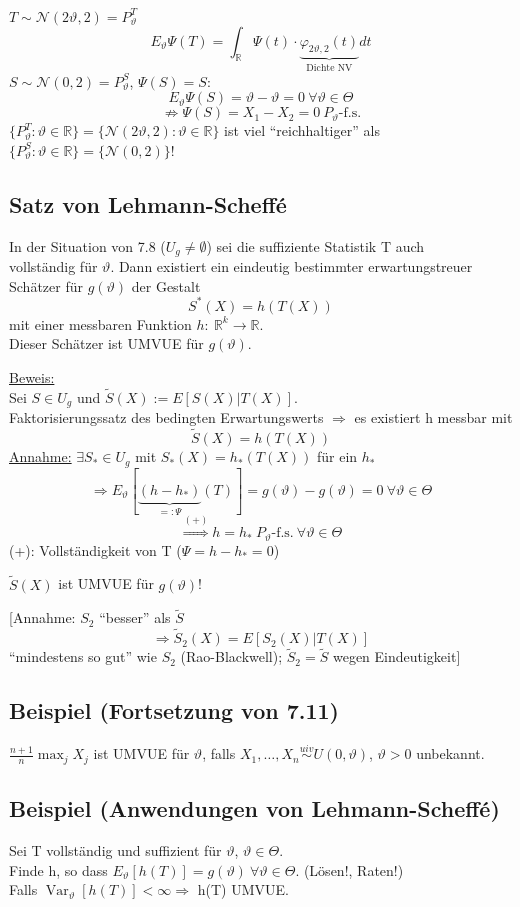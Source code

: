 \documentclass[a4paper,11pt,twoside,titlepage]{article}
\newcommand{\R}{{\mathbb R}}
\newcommand\NN{ \mathcal{N} } %
\newcommand{\uiv}{\ensuremath{\stackrel{uiv}{\sim}}}
\DeclareMathOperator{\var}{Var}
\begin{document}
$T\sim\NN(2\vartheta,2)=P_\vartheta^T$
\[E_\vartheta\Psi(T)=\int_\R\Psi(t)\cdot\underbrace{\varphi_{2\vartheta,2}(t)}_{\mbox{Dichte NV}}dt\]
$S\sim\NN(0,2)=P_\vartheta^S$, $\Psi(S)=S$:
\[E_\vartheta\Psi(S)=\vartheta-\vartheta=0\ \forall\vartheta\in\Theta\]
\[\not\Rightarrow \Psi(S)=X_1-X_2=0\ P_\vartheta\mbox{-f.s.}\]
$\{P_\vartheta^T:\vartheta\in\R\}=\{\NN(2\vartheta,2):\vartheta\in\R\}$ ist viel "`reichhaltiger"' als\\ $\{P_\vartheta^S:\vartheta\in\R\}=\{\NN(0,2)\}$!

\subsection{Satz von Lehmann-Scheffé}
In der Situation von 7.8 ($U_g\neq\emptyset$) sei die suffiziente Statistik T auch\\ vollständig für $\vartheta$. Dann existiert ein eindeutig bestimmter erwartungstreuer Schätzer für $g(\vartheta)$ der Gestalt
\[S^\ast(X)=h(T(X))\] mit einer messbaren Funktion $h:\ \R^k\to\R$.\\
Dieser Schätzer ist UMVUE für $g(\vartheta)$.

\underline{Beweis:}\\
Sei $S\in U_g$ und $\tilde S(X):=E[S(X)|T(X)]$.\\
Faktorisierungssatz des bedingten Erwartungswerts $\Rightarrow$ es existiert h messbar mit
\[\tilde S(X)=h(T(X))\]
\underline{Annahme:} $\exists S_\ast\in U_g$ mit $S_\ast(X)=h_\ast(T(X))$ für ein $h_\ast$
\[\Rightarrow E_\vartheta[\underbrace{(h-h_\ast)}_{=:\Psi}(T)]=g(\vartheta)-g(\vartheta)=0\ \forall\vartheta\in\Theta\]
\[\stackrel{(+)}{\Rightarrow} h=h_\ast\ P_\vartheta\mbox{-f.s.}\ \forall\vartheta\in\Theta\]
(+): Vollständigkeit von T ($\Psi=h-h_\ast=0$)

$\tilde S(X)$ ist UMVUE für $g(\vartheta)$!

[Annahme: $S_2$ "`besser"' als $\tilde S$
$$\Rightarrow \tilde S_2(X)=E[S_2(X)|T(X)]$$ "`mindestens so gut"' wie $S_2$ (Rao-Blackwell); $\tilde S_2=\tilde S$ wegen Eindeutigkeit]

\subsection{Beispiel \textnormal{(Fortsetzung von 7.11)}} 
$\frac{n+1}{n}\max_j X_j$ ist UMVUE für $\vartheta$, falls $X_1,\ldots,X_n\uiv U(0,\vartheta)$, $\vartheta>0$ unbekannt.

\subsection{Beispiel (Anwendungen von Lehmann-Scheffé)}
Sei T vollständig und suffizient für $\vartheta$, $\vartheta\in\Theta$.\\
Finde h, so dass $E_\vartheta[h(T)]=g(\vartheta)\ \forall\vartheta\in\Theta$. (Lösen!, Raten!)\\
Falls $\var_\vartheta[h(T)]<\infty \Rightarrow$ h(T) UMVUE.
\end{document}
